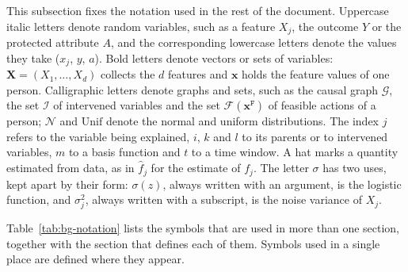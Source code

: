 This subsection fixes the notation used in the rest of the document. Uppercase italic letters
denote random variables, such as a feature $X_j$, the outcome $Y$ or the protected attribute $A$,
and the corresponding lowercase letters denote the values they take ($x_j$, $y$, $a$). Bold letters
denote vectors or sets of variables: $\mathbf{X} = (X_1, \dots, X_d)$ collects the $d$ features and
$\mathbf{x}$ holds the feature values of one person. Calligraphic letters denote graphs and sets,
such as the causal graph $\mathcal{G}$, the set $\mathcal{I}$ of intervened variables and the set
$\mathcal{F}(\mathbf{x}^{\mathtt{F}})$ of feasible actions of a person; $\mathcal{N}$ and $\mathrm{Unif}$ denote the
normal and uniform distributions. The index $j$ refers to the variable being explained, $i$, $k$
and $l$ to its parents or to intervened variables, $m$ to a basis function and $t$ to a time
window. A hat marks a quantity estimated from data, as in $\hat{f}_j$ for the estimate of $f_j$.
The letter $\sigma$ has two uses, kept apart by their form: $\sigma(z)$, always written with an
argument, is the logistic function, and $\sigma_j^2$, always written with a subscript, is the
noise variance of $X_j$.

Table~\ref{tab:bg-notation} lists the symbols that are used in more than one section, together
with the section that defines each of them. Symbols used in a single place are defined where they
appear.

